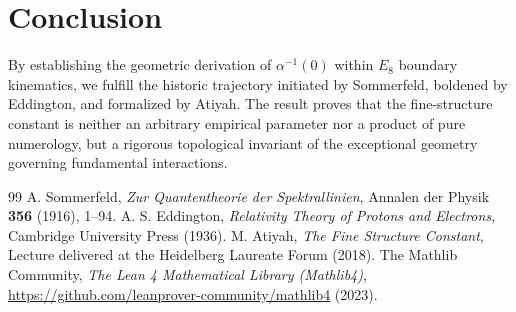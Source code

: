 \documentclass[11pt,a4paper]{article}
\begin{document}
\section{Conclusion}

By establishing the geometric derivation of $\alpha^{-1}(0)$ within $E_8$ boundary kinematics, we fulfill the historic trajectory initiated by Sommerfeld, boldened by Eddington, and formalized by Atiyah. The result proves that the fine-structure constant is neither an arbitrary empirical parameter nor a product of pure numerology, but a rigorous topological invariant of the exceptional geometry governing fundamental interactions.

\begin{thebibliography}{99}
 A. Sommerfeld, \textit{Zur Quantentheorie der Spektrallinien}, Annalen der Physik \textbf{356} (1916), 1--94.
 A. S. Eddington, \textit{Relativity Theory of Protons and Electrons}, Cambridge University Press (1936).
 M. Atiyah, \textit{The Fine Structure Constant}, Lecture delivered at the Heidelberg Laureate Forum (2018).
 The Mathlib Community, \textit{The Lean 4 Mathematical Library (Mathlib4)}, \url{https://github.com/leanprover-community/mathlib4} (2023).
\end{thebibliography}
\end{document}
